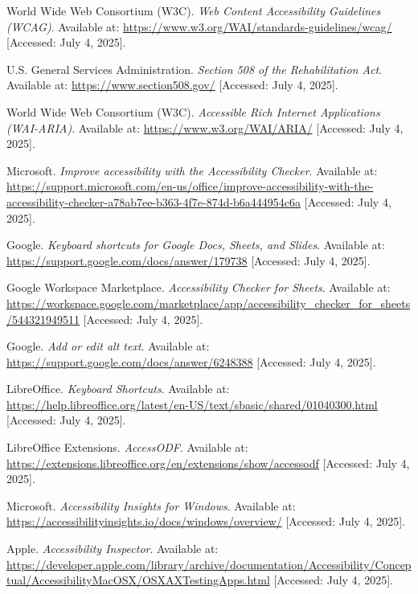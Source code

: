 \begin{thebibliography}{99}

 World Wide Web Consortium (W3C). \textit{Web Content Accessibility Guidelines (WCAG)}. Available at: \url{https://www.w3.org/WAI/standards-guidelines/wcag/} [Accessed: July 4, 2025].

 U.S. General Services Administration. \textit{Section 508 of the Rehabilitation Act}. Available at: \url{https://www.section508.gov/} [Accessed: July 4, 2025].

 World Wide Web Consortium (W3C). \textit{Accessible Rich Internet Applications (WAI-ARIA)}. Available at: \url{https://www.w3.org/WAI/ARIA/} [Accessed: July 4, 2025].

 Microsoft. \textit{Improve accessibility with the Accessibility Checker}. Available at: \url{https://support.microsoft.com/en-us/office/improve-accessibility-with-the-accessibility-checker-a78ab7ee-b363-4f7e-874d-b6a444954c6a} [Accessed: July 4, 2025].

 Google. \textit{Keyboard shortcuts for Google Docs, Sheets, and Slides}. Available at: \url{https://support.google.com/docs/answer/179738} [Accessed: July 4, 2025].

 Google Workspace Marketplace. \textit{Accessibility Checker for Sheets}. Available at: \url{https://workspace.google.com/marketplace/app/accessibility_checker_for_sheets/544321949511} [Accessed: July 4, 2025].

 Google. \textit{Add or edit alt text}. Available at: \url{https://support.google.com/docs/answer/6248388} [Accessed: July 4, 2025].

 LibreOffice. \textit{Keyboard Shortcuts}. Available at: \url{https://help.libreoffice.org/latest/en-US/text/sbasic/shared/01040300.html} [Accessed: July 4, 2025].

 LibreOffice Extensions. \textit{AccessODF}. Available at: \url{https://extensions.libreoffice.org/en/extensions/show/accessodf} [Accessed: July 4, 2025].

 Microsoft. \textit{Accessibility Insights for Windows}. Available at: \url{https://accessibilityinsights.io/docs/windows/overview/} [Accessed: July 4, 2025].

 Apple. \textit{Accessibility Inspector}. Available at: \url{https://developer.apple.com/library/archive/documentation/Accessibility/Conceptual/AccessibilityMacOSX/OSXAXTestingApps.html} [Accessed: July 4, 2025].


\end{thebibliography}
